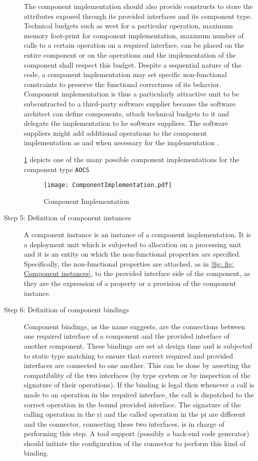 \begin{description}
The component implementation should also provide constructs to store the attributes exposed through its provided interfaces and its component type. Technical budgets such as \ac{wcet} for a particular operation, maximum memory foot-print for component implementation, maximum number of calls to a certain operation on a required interface, can be placed on the entire component or on the operations and the implementation of the component shall respect this budget. Despite a sequential nature of the code, a component implementation may set specific non-functional constraints to preserve the functional correctness of its behavior. Component implementation is thus a particularly attractive unit to be subcontracted to a third-party software supplier because the software architect can define components, attach technical budgets to it and delegate the implementation to he software suppliers. The software suppliers might add additional operations to the component implementation as and when necessary for the implementation \cite{CompBasedProcess}. 

\cref{fig: Component implementation} depicts one of the many possible component implementations for the component type \texttt{AOCS}

\begin{figure}[h]
	\centering
	\texttt{[image: ComponentImplementation.pdf]}
	\caption{Component Implementation}
	\label{fig: Component implementation}
\end{figure} 

\item [Step 5: Definition of component instances] A component instance is an instance of a component implementation. It is a deployment unit which is subjected to allocation on a processing unit and it is an entity on which the non-functional properties are specified. Specifically, the non-functional properties are attached, as in \cref{fig: fig: Component instances}, to the provided interface side of the component, as they are the expression of a property or a provision of the component instance.

\item [Step 6: Definition of component bindings] Component bindings, as the name suggests, are the connections between one required interface of a component and the provided interface of another component. These bindings are set at design time and is subjected to static type matching to ensure that correct required and provided interfaces are connected to one another. This can be done by asserting the compatibility of the two interfaces (by type system or by inspection of the signature of their operations). If the binding is legal then whenever a call is made to an operation in the required interface, the call is dispatched to the correct operation in the bound provided interface. The signature of the calling operation in the \ac{ri} and the called operation in the \ac{pi} are different and the connector, connecting these two interfaces, is in charge of performing this step. A tool support (possibly a back-end code generator) should initiate the configuration of the connector to perform this kind of binding.


\end{description}
